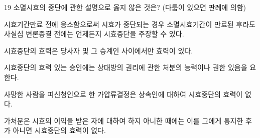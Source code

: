 \begin{question}{19}
소멸시효의 중단에 관한 설명으로 옳지 않은 것은? (다툼이 있으면 판례에 의함)
\begin{choices}
  \item 시효기간만료 전에 응소함으로써 시효가 중단되는 경우 소멸시효기간이 만료된 후라도 사실심 변론종결 전에는 언제든지 시효중단을 주장할 수 있다.
  \item 시효중단의 효력은 당사자 및 그 승계인 사이에서만 효력이 있다.
  \item 시효중단의 효력 있는 승인에는 상대방의 권리에 관한 처분의 능력이나 권한 있음을 요한다.
  \item 사망한 사람을 피신청인으로 한 가압류결정은 상속인에 대하여 시효중단의 효력이 없다.
  \item 가처분은 시효의 이익을 받은 자에 대하여 하지 아니한 때에는 이를 그에게 통지한 후가 아니면 시효중단의 효력이 없다.
\end{choices}
\end{question}
